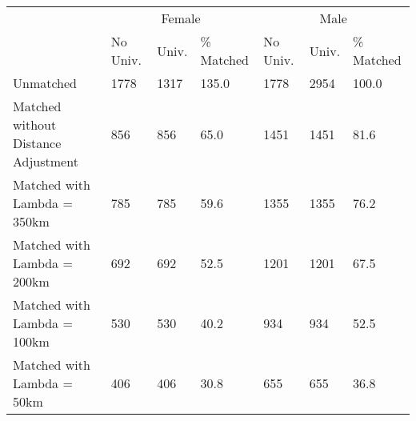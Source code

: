 
\begin{tabular}{lllllll}
\toprule
\multicolumn{1}{c}{ } & \multicolumn{3}{c}{Female} & \multicolumn{3}{c}{Male} \\
\cmidrule(l{3pt}r{3pt}){2-4} \cmidrule(l{3pt}r{3pt}){5-7}
 & No Univ. & Univ. & \% Matched & No Univ. & Univ. & \% Matched\\
\midrule
Unmatched & 1778 & 1317 & 135.0 & 1778 & 2954 & 100.0\\
Matched without Distance Adjustment & 856 & 856 & 65.0 & 1451 & 1451 & 81.6\\
Matched with Lambda = 350km & 785 & 785 & 59.6 & 1355 & 1355 & 76.2\\
Matched with Lambda = 200km & 692 & 692 & 52.5 & 1201 & 1201 & 67.5\\
Matched with Lambda = 100km & 530 & 530 & 40.2 & 934 & 934 & 52.5\\
Matched with Lambda = 50km & 406 & 406 & 30.8 & 655 & 655 & 36.8\\
\bottomrule
\end{tabular}

